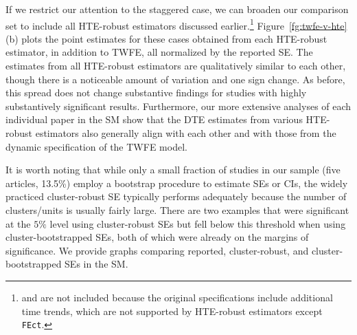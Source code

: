 \documentclass[12pt]{article}
\begin{document}
If we restrict our attention to the staggered case, we can broaden our comparison set to include all HTE-robust estimators discussed earlier.\footnote{\citet{Kogan2021} and \citet{magaloni2020killing} are not included because the original specifications include additional time trends, which are not supported by HTE-robust estimators except \texttt{FEct}.} Figure~\ref{fg:twfe-v-hte}(b) plots the point estimates for these cases obtained from each HTE-robust estimator, in addition to TWFE, all normalized by the reported SE. The estimates from all HTE-robust estimators are qualitatively similar to each other, though there is a noticeable amount of variation and one sign change. As before, this spread does not change substantive findings for studies with highly substantively significant results. Furthermore, our more extensive analyses of each individual paper in the SM show that the DTE estimates from various HTE-robust estimators also generally align with each other and with those from the dynamic specification of the TWFE model. 

It is worth noting that while only a small fraction of studies in our sample (five articles, 13.5\%) employ a bootstrap procedure to estimate SEs or CIs, the widely practiced cluster-robust SE typically performs adequately because the number of clusters/units is usually fairly large. There are two examples that were significant at the $5\%$ level using cluster-robust SEs but fell below this threshold when using cluster-bootstrapped SEs, both of which were already on the margins of significance. We provide graphs comparing reported, cluster-robust, and cluster-bootstrapped SEs in the SM. 
\FloatBarrier



\end{document}
